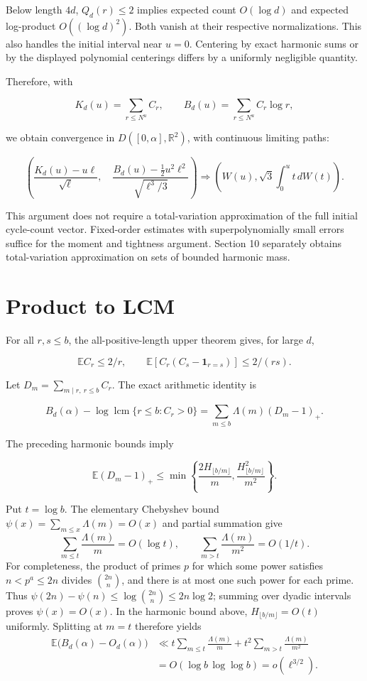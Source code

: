 \documentclass[11pt]{article}
\theoremstyle{remark}
\begin{document}
Below length \(4d\), \(Q_d(r)\le2\) implies expected count \(O(\log d)\)
and expected log-product \(O((\log d)^2)\). Both vanish at their
respective normalizations. This also handles the initial interval near
\(u=0\). Centering by exact harmonic sums or by the displayed polynomial
centerings differs by a uniformly negligible quantity.

Therefore, with

\[
 K_d(u)=\sum_{r\le N^u}C_r,\qquad
 B_d(u)=\sum_{r\le N^u}C_r\log r,
\]

we obtain convergence in \(D([0,\alpha],\mathbb R^2)\), with continuous
limiting paths:

\[
 \left(
 \frac{K_d(u)-u\ell}{\sqrt\ell},\quad
 \frac{B_d(u)-\tfrac12u^2\ell^2}{\sqrt{\ell^3/3}}
 \right)
 \Longrightarrow
 \left(W(u),\sqrt3\int_0^u t\,dW(t)\right).
 \tag{8.2}\label{eq:8.2}
\]

This argument does not require a total-variation approximation of the
full initial cycle-count vector. Fixed-order estimates with
superpolynomially small errors suffice for the moment and tightness
argument. Section 10 separately obtains total-variation approximation on
sets of bounded harmonic mass.

\section{Product to LCM}\label{product-to-lcm}

For all \(r,s\le b\), the all-positive-length upper theorem gives, for
large \(d\),

\[
 \mathbb EC_r\le2/r,\qquad
 \mathbb E[C_r(C_s-\mathbf1_{r=s})]\le2/(rs).
\]

Let \(D_m=\sum_{m\mid r,\ r\le b}C_r\). The exact arithmetic identity is

\[
 B_d(\alpha)-\log\operatorname{lcm}\{r\le b:C_r>0\}
 =\sum_{m\le b}\Lambda(m)(D_m-1)_+.
\]

The preceding harmonic bounds imply

\[
 \mathbb E(D_m-1)_+
 \le\min\left\{\frac{2H_{\lfloor b/m\rfloor}}m,
 \frac{H_{\lfloor b/m\rfloor}^2}{m^2}\right\}.
\]

Put \(t=\log b\). The elementary Chebyshev bound
\(\psi(x)=\sum_{m\le x}\Lambda(m)=O(x)\) and partial summation give \[
 \sum_{m\le t}\frac{\Lambda(m)}m=O(\log t),\qquad
 \sum_{m>t}\frac{\Lambda(m)}{m^2}=O(1/t).
 \tag{9.1}\label{eq:9.1}
\] For completeness, the product of primes \(p\) for which some power
satisfies \(n<p^a\le2n\) divides \(\binom{2n}{n}\), and there is at most
one such power for each prime. Thus
\(\psi(2n)-\psi(n)\le\log\binom{2n}{n}\le2n\log2\); summing over dyadic
intervals proves \(\psi(x)=O(x)\). In the harmonic bound above,
\(H_{\lfloor b/m\rfloor}=O(t)\) uniformly. Splitting at \(m=t\)
therefore yields \[
 \begin{aligned}
 \mathbb E\bigl(B_d(\alpha)-O_d(\alpha)\bigr)
 &\ll t\sum_{m\le t}\frac{\Lambda(m)}m
       +t^2\sum_{m>t}\frac{\Lambda(m)}{m^2}\\
 &=O(\log b\,\log\log b)=o(\ell^{3/2}).
 \end{aligned}
 \tag{9.2}\label{eq:9.2}
\]
\end{document}
